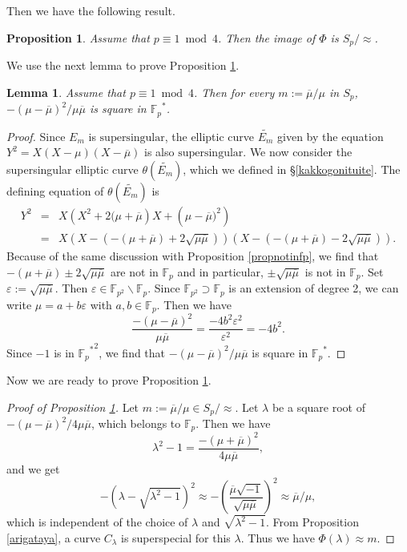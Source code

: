 \documentclass[a4paper, 11pt]{article}
\theoremstyle{plain}
\newtheorem{prop}[defn]{Proposition}
\newtheorem{lem}[defn]{Lemma}
\newcommand{\?}{\textcolor{red}{??}}
\newcommand{\lm}{\lambda}
\newcommand{\fp}{\mathbb{F}_p}
\newcommand{\fpp}{\mathbb{F}_{p^2}}
\newcommand{\super}{\text{supersingular}}
\begin{document}
Then we have the following result.
\begin{prop}
\label{resp1}
Assume that $p \equiv 1 \bmod4$. Then the image of $\Phi$ is $S_{p}/\approx$. 
\end{prop}

We use the next lemma to prove Proposition \ref{resp1}.
\begin{lem}
\label{munozyoukenn}
    Assume that $p \equiv 1 \bmod 4$. Then for every $m:=\overline{\mu}/{\mu}$ in $S_p$,
    $-(\mu-\overline{\mu})^2/\mu \overline{\mu}$ is square in ${\fp}^{*}$.
\end{lem}

\begin{proof}
    Since $E_m$ is $\super$, the elliptic curve
    $\widetilde{E_m}$ given by the equation $Y^2=X(X-\mu)(X-\overline{\mu})$ is also $\super$. We now consider the supersingular elliptic curve $\theta(\widetilde{E_m})$, which we defined in \S \ref{kakkogonituite}. The defining equation of $\theta(\widetilde{E_m})$ is
    \begin{eqnarray*}
Y^2&=&X\left(X^2+2(\mu+\overline{\mu}\right)X+\left(\mu-\overline{\mu})^2 \right)\\
&=&X \left(X-\left(-(\mu+\overline{\mu})+2\sqrt{\mu \overline{\mu}}\right) \right) \left(X- \left(-(\mu+\overline{\mu})-2\sqrt{\mu \overline{\mu}} \right) \right).
    \end{eqnarray*}
    Because of the same discussion with Proposition \ref{propnotinfp}, we find that $-(\mu+\overline{\mu}) \pm 2\sqrt{\mu \overline{\mu}}$ are not in $\fp$ and in particular, $\pm \sqrt{\mu \overline{\mu}}$ is not in $\fp$. Set $\varepsilon:=\sqrt{\mu \overline{\mu}}$. Then $\varepsilon \in \fpp \smallsetminus \fp$. Since $\fpp \supset \fp$ is an extension of degree 2, we can write $\mu=a+b\varepsilon$ with $a,b \in \fp$. Then we have
    \[
    \frac{-(\mu-\overline{\mu})^2}{\mu \overline{\mu}}=\frac{-4b^2 {\varepsilon}^2}{{\varepsilon}^2}=-4b^2.
    \]
    Since $-1$ is in ${{\fp}^{*}}^2$, we find that $-(\mu-\overline{\mu})^2/\mu \overline{\mu}$ is square in ${\fp}^{*}$.
\end{proof}

Now we are ready to prove Proposition \ref{resp1}.

\begin{proof}[Proof of Proposition \ref{resp1}]
Let $m:= \overline{\mu}/\mu \in S_p/\approx$. 
Let $\lm$ be a square root of $-(\mu-\overline{\mu})^2/4\mu \overline{\mu}$, which belongs to $\fp$. Then we have
\[
{\lm}^2-1=\frac{-(\mu+\overline{\mu})^2}{4\mu \overline{\mu}},
\]
and we get 
\[
-\left(\lm-\sqrt{{\lm}^2-1} \right)^2 \approx - \left( \frac{\overline{\mu}\sqrt{-1}}{\sqrt{\mu \overline{\mu}}} \right)^2 \approx \overline{\mu}/\mu,
\]
which is independent of the choice of $\lm$ and $\sqrt{{\lm}^2-1}$.
From Proposition \ref{arigataya}, a curve $C_{\lm}$ is superspecial for this $\lm$. Thus we have ${\Phi}(\lm) \approx m$.
\end{proof}
\end{document}
